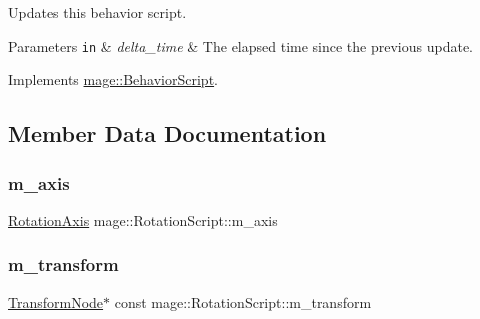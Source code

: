 Updates this behavior script.


\begin{DoxyParams}[1]{Parameters}
\mbox{\tt in}  & {\em delta\+\_\+time} & The elapsed time since the previous update. \\
\hline
\end{DoxyParams}


Implements \hyperlink{classmage_1_1_behavior_script_a905b6c83640cb91d19fecab3435f6feb}{mage\+::\+Behavior\+Script}.



\subsection{Member Data Documentation}
\hypertarget{classmage_1_1_rotation_script_a8fb1d0fb6e3dac1dd91f2d16e1954f21}{}\label{classmage_1_1_rotation_script_a8fb1d0fb6e3dac1dd91f2d16e1954f21} 
\subsubsection{\texorpdfstring{m\+\_\+axis}{m\_axis}}
{\footnotesize\ttfamily \hyperlink{classmage_1_1_rotation_script_ad06cf896ce6dfe4f6676b263d15b4ee9}{Rotation\+Axis} mage\+::\+Rotation\+Script\+::m\+\_\+axis\hspace{0.3cm}{\ttfamily [private]}}

\hypertarget{classmage_1_1_rotation_script_a9dd84c2b928dece60bc1d72a16b20030}{}\label{classmage_1_1_rotation_script_a9dd84c2b928dece60bc1d72a16b20030} 
\subsubsection{\texorpdfstring{m\+\_\+transform}{m\_transform}}
{\footnotesize\ttfamily \hyperlink{structmage_1_1_transform_node}{Transform\+Node}$\ast$ const mage\+::\+Rotation\+Script\+::m\+\_\+transform\hspace{0.3cm}{\ttfamily [private]}}

